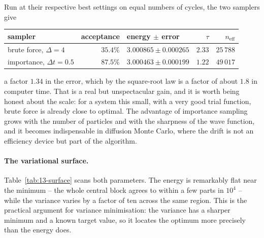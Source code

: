 Run at their respective best settings on equal numbers of cycles, the two
samplers give
\begin{center}
\renewcommand{\arraystretch}{1.2}
\setlength{\tabcolsep}{12pt}
\begin{tabular}{lrlrr}
\toprule
sampler & acceptance & energy $\pm$ error & $\tau$ & $n_{\mathrm{eff}}$\\
\midrule
brute force, $\Delta=4$ & $35.4\%$ & $3.000865\pm0.000265$ & $2.33$ & $25\,788$\\
importance, $\Delta t=0.5$ & $87.5\%$ & $3.000463\pm0.000199$ & $1.22$ & $49\,017$\\
\bottomrule
\end{tabular}
\end{center}
a factor $1.34$ in the error, which by the square-root law is a factor of
about $1.8$ in computer time.  That is a real but unspectacular gain, and it
is worth being honest about the scale: for a system this small, with a very
good trial function, brute force is already close to optimal.  The advantage
of importance sampling grows with the number of particles and with the
sharpness of the wave function, and it becomes indispensable in diffusion
Monte Carlo, where the drift is not an efficiency device but part of the
algorithm.

\paragraph{The variational surface.}
Table~\ref{tab:13-surface} scans both parameters.  The energy is remarkably
flat near the minimum -- the whole central block agrees to within a few parts
in $10^4$ -- while the variance varies by a factor of ten across the same
region.  This is the practical argument for variance minimisation: the
variance has a sharper minimum and a known target value, so it locates the
optimum more precisely than the energy does.

